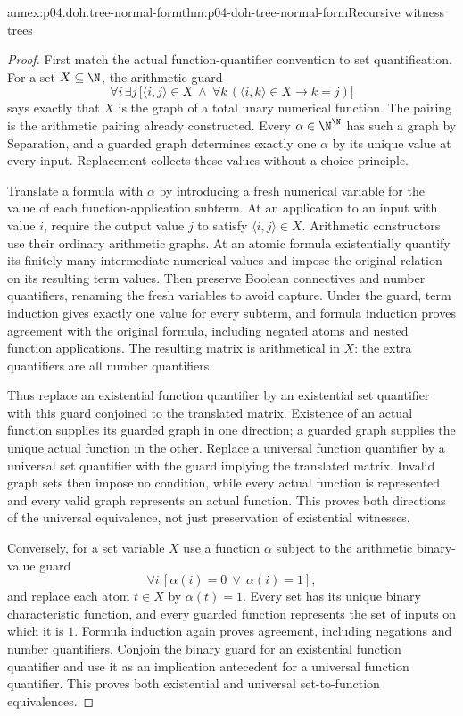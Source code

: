 \begin{annexitem}{annex:p04.doh.tree-normal-form}{thm:p04-doh-tree-normal-form}{Recursive witness trees}
\begin{proof}
First match the actual function-quantifier convention to set quantification.
For a set \(X\subseteq\N\), the arithmetic guard
\[
 \forall i\,\exists j\,
 \bigl[\langle i,j\rangle\in X\ \land\
       \forall k\,(\langle i,k\rangle\in X\longrightarrow k=j)\bigr]
\]
says exactly that \(X\) is the graph of a total unary numerical function.
The pairing is the arithmetic pairing already constructed. Every
\(\alpha\in\N^{\N}\) has such a graph by Separation, and a guarded
graph determines exactly one \(\alpha\) by its unique value at every
input. Replacement collects these values without a choice principle.

Translate a formula with \(\alpha\) by introducing a fresh numerical
variable for the value of each function-application subterm. At an
application to an input with value \(i\), require the output value \(j\)
to satisfy \(\langle i,j\rangle\in X\). Arithmetic constructors use
their ordinary arithmetic graphs. At an atomic formula existentially
quantify its finitely many intermediate numerical values and impose the
original relation on its resulting term values. Then preserve Boolean
connectives and number quantifiers, renaming the fresh variables to avoid
capture. Under the guard, term induction gives exactly one value for
every subterm, and formula induction proves agreement with the original
formula, including negated atoms and nested function applications.
The resulting matrix is arithmetical in \(X\): the extra quantifiers
are all number quantifiers.

Thus replace an existential function quantifier by an existential set
quantifier with this guard conjoined to the translated matrix. Existence
of an actual function supplies its guarded graph in one direction; a
guarded graph supplies the unique actual function in the other. Replace
a universal function quantifier by a universal set quantifier with the
guard implying the translated matrix. Invalid graph sets then impose no
condition, while every actual function is represented and every valid
graph represents an actual function. This proves both directions of
the universal equivalence, not just preservation of existential witnesses.

Conversely, for a set variable \(X\) use a function \(\alpha\) subject
to the arithmetic binary-value guard
\[
 \forall i\,[\alpha(i)=0\ \lor\ \alpha(i)=1],
\]
and replace each atom \(t\in X\) by \(\alpha(t)=1\). Every set
has its unique binary characteristic function, and every guarded function
represents the set of inputs on which it is \(1\). Formula induction
again proves agreement, including negations and number quantifiers.
Conjoin the binary guard for an existential function quantifier and use
it as an implication antecedent for a universal function quantifier.
This proves both existential and universal set-to-function equivalences.


\end{proof}
\end{annexitem}
